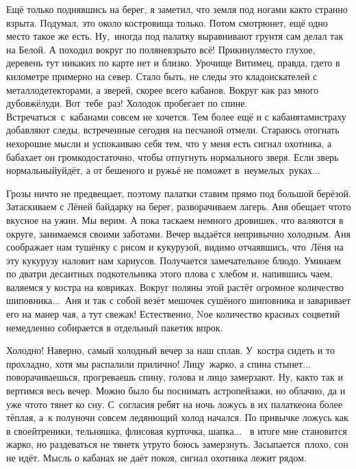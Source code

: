 Ещё только поднявшись на берег, я заметил, что земля под ногами как\sdash то странно взрыта. Подумал, это около костровища только. Потом смотрю\mdash нет, ещё одно место такое же есть. Ну,~иногда под палатку выравнивают грунт\mdash я сам делал так на Белой. А походил вокруг по поляне\mdash взрыто всё! Прикинул\mdash место глухое, деревень тут никаких по карте нет и близко. Урочище Витимец, правда, где\sdash то в километре примерно на север. Стало быть, не следы это кладоискателей с металлодетекторами, а зверей, скорее всего кабанов. Вокруг как раз много дубов\mdash жёлуди. Вот~тебе~раз! Холодок пробегает по спине. Встречаться~с~кабанами совсем не хочется. Тем более ещё и с кабанятами\mdash страху добавляют следы, встреченные сегодня на песчаной отмели. Стараюсь отогнать нехорошие мысли и успокаиваю себя тем, что у меня есть сигнал охотника, а бабахает он громко\mdash достаточно, чтобы отпугнуть нормального зверя. Если зверь нормальный\mdash уйдёт, а от бешеного и ружьё не поможет в~неумелых~руках$\ldots$ 

Грозы ничто не предвещает, поэтому палатки ставим прямо под большой берёзой. Затаскиваем с Лёней байдарку на берег, разворачиваем лагерь. Аня обещает что\sdash то вкусное на ужин. Мы верим. А пока таскаем немного дровишек, что валяются в округе, занимаемся своими заботами. Вечер выдаётся непривычно холодным. Аня соображает нам тушёнку с рисом и кукурузой, видимо отчаявшись, что~Лёня на эту кукурузу наловит нам хариусов. Получается замечательное блюдо. Уминаем по два\sdash три десантных подкотельника этого плова с хлебом и, напившись чаем, валяемся у костра на ковриках. Вокруг поляны этой растёт огромное количество шиповника$\ldots$~Аня и так с собой везёт мешочек сушёного шиповника и заваривает его на манер чая, а тут свежак! Естественно, N\sdash ое количество красных соцветий немедленно собирается в отдельный пакетик впрок.

Холодно! Наверно, самый холодный вечер за наш сплав. У~костра сидеть и то прохладно, хотя мы распалили прилично! Лицу~жарко, а спина стынет$\ldots$~ поворачиваешься, прогреваешь спину, голова и лицо замерзают. Ну, как\sdash то так и вертимся весь вечер. Можно было бы поснимать астропейзажи, но облачно, да и уже что\sdash то тянет ко сну. С~согласия ребят на ночь ложусь в их палатке\mdash она более тёплая, а~к полуночи совсем ледянющий холод начался. По привычке ложусь как в своей\mdash треники, тельняшка, флисовая курточка, шапка$\ldots$~ в итоге мне становится жарко, но раздеваться не тянет\mdash к утру\sdash то боюсь замерзнуть. Засыпается~плохо, сон не идёт. Мысль о кабанах не даёт покоя, сигнал охотника лежит рядом. 

\begin{center}
\end{center}